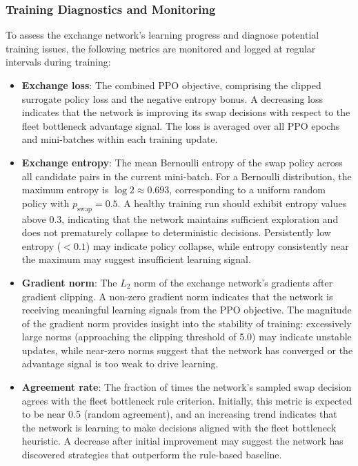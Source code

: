 \subsubsection{Training Diagnostics and Monitoring}

To assess the exchange network's learning progress and diagnose potential training issues, the following metrics are monitored and logged at regular intervals during training:

\begin{itemize}
    \item \textbf{Exchange loss}: The combined PPO objective, comprising the clipped surrogate policy loss and the negative entropy bonus. A decreasing loss indicates that the network is improving its swap decisions with respect to the fleet bottleneck advantage signal. The loss is averaged over all PPO epochs and mini-batches within each training update.

    \item \textbf{Exchange entropy}: The mean Bernoulli entropy of the swap policy across all candidate pairs in the current mini-batch. For a Bernoulli distribution, the maximum entropy is $\log 2 \approx 0.693$, corresponding to a uniform random policy with $p_{\text{swap}} = 0.5$. A healthy training run should exhibit entropy values above 0.3, indicating that the network maintains sufficient exploration and does not prematurely collapse to deterministic decisions. Persistently low entropy ($< 0.1$) may indicate policy collapse, while entropy consistently near the maximum may suggest insufficient learning signal.

    \item \textbf{Gradient norm}: The $L_2$ norm of the exchange network's gradients after gradient clipping. A non-zero gradient norm indicates that the network is receiving meaningful learning signals from the PPO objective. The magnitude of the gradient norm provides insight into the stability of training: excessively large norms (approaching the clipping threshold of 5.0) may indicate unstable updates, while near-zero norms suggest that the network has converged or the advantage signal is too weak to drive learning.

    \item \textbf{Agreement rate}: The fraction of times the network's sampled swap decision agrees with the fleet bottleneck rule criterion. Initially, this metric is expected to be near 0.5 (random agreement), and an increasing trend indicates that the network is learning to make decisions aligned with the fleet bottleneck heuristic. A decrease after initial improvement may suggest the network has discovered strategies that outperform the rule-based baseline.
\end{itemize}

